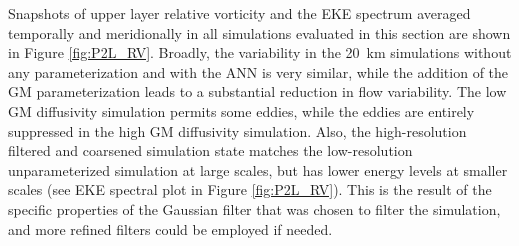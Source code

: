 \documentclass[draft]{agujournal2019}
\begin{document}


Snapshots of upper layer relative vorticity and the EKE spectrum averaged temporally and meridionally in all simulations evaluated in this section are shown in Figure \ref{fig:P2L_RV}. Broadly, the variability in the 20~km simulations without any parameterization and with the ANN is very similar, while the addition of the GM parameterization leads to a substantial reduction in flow variability. The low GM diffusivity simulation permits some eddies, while the eddies are entirely suppressed in the high GM diffusivity simulation. Also, the high-resolution filtered and coarsened simulation state matches the low-resolution unparameterized simulation at large scales, but has lower energy levels at smaller scales (see EKE spectral plot in Figure \ref{fig:P2L_RV}). This is the result of the specific properties of the Gaussian filter that was chosen to filter the simulation, and more refined filters could  be employed if needed.
\end{document}
